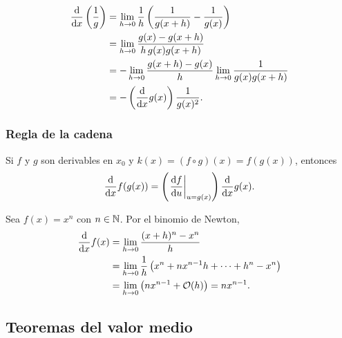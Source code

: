 \begin{demostracion}
  \begin{equation}
    \label{eq:demo_reciproco}
    \begin{aligned}
      \frac{\mathrm{d}}{\mathrm{d}x}\left( \frac{1}{g} \right)
        &=\lim_{h\rightarrow 0}\frac{1}{h}
          \left( \frac{1}{g(x+h)}-\frac{1}{g(x)} \right)\\
        &=\lim_{h\rightarrow 0}\frac{g(x)-g(x+h)}{h\,g(x)g(x+h)}\\
        &=-\lim_{h\rightarrow 0}\frac{g(x+h)-g(x)}{h}
          \lim_{h\rightarrow 0}\frac{1}{g(x)g(x+h)}\\
        &=-\left( \frac{\mathrm{d}}{\mathrm{d}x}g(x) \right)\frac{1}{g(x)^2}.
    \end{aligned}
  \end{equation}
\end{demostracion}

\subsubsection{Regla de la cadena}
\label{subsubsec:regla_cadena_1d}

Si $f$ y $g$ son derivables en $x_0$ y $k(x)=(f\circ g)(x)=f(g(x))$, entonces
\begin{equation}
  \label{eq:regla_cadena_1d}
  \frac{\mathrm{d}}{\mathrm{d}x}f(g(x))=\left( \left. \frac{\mathrm{d}f}{\mathrm{d}u} \right|_{u=g(x)} \right)\frac{\mathrm{d}}{\mathrm{d}x}g(x).
\end{equation}

\begin{ejemplo}[Derivada de $x^n$]
  \label{ej:derivada_potencia}
  Sea $f(x)=x^n$ con $n\in\mathbb{N}$. Por el binomio de Newton,
  \begin{equation}
    \label{eq:derivada_potencia}
    \begin{aligned}
      \frac{\mathrm{d}}{\mathrm{d}x}f(x)
        &=\lim_{h\rightarrow 0}\frac{(x+h)^n-x^n}{h}\\
        &=\lim_{h\rightarrow 0}\frac{1}{h}
          \left( x^n+nx^{n-1}h+\dots+h^n-x^n \right)\\
        &=\lim_{h\rightarrow 0}\left( nx^{n-1}+\mathcal{O}(h) \right)
         =nx^{n-1}.
    \end{aligned}
  \end{equation}
\end{ejemplo}

\subsection{Teoremas del valor medio}
\label{subsec:valor_medio}

